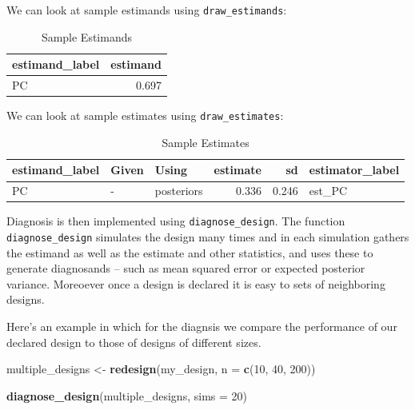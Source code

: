 \documentclass[
  12pt,
]{book}
\newenvironment{Shaded}{\begin{snugshade}}{\end{snugshade}}
\newcommand{\DataTypeTok}[1]{\textcolor[rgb]{0.13,0.29,0.53}{#1}}
\newcommand{\DecValTok}[1]{\textcolor[rgb]{0.00,0.00,0.81}{#1}}
\newcommand{\KeywordTok}[1]{\textcolor[rgb]{0.13,0.29,0.53}{\textbf{#1}}}
\newcommand{\NormalTok}[1]{#1}
\newcommand{\StringTok}[1]{\textcolor[rgb]{0.31,0.60,0.02}{#1}}
\begin{document}
We can look at sample estimands using \texttt{draw\_estimands}:

\begin{table}

\caption{\label{tab:estimands}Sample Estimands}
\centering
\begin{tabular}[t]{l|r}
\hline
estimand\_label & estimand\\
\hline
PC & 0.697\\
\hline
\end{tabular}
\end{table}

We can look at sample estimates using \texttt{draw\_estimates}:

\begin{table}

\caption{\label{tab:estimates}Sample Estimates}
\centering
\begin{tabular}[t]{l|l|l|r|r|l}
\hline
estimand\_label & Given & Using & estimate & sd & estimator\_label\\
\hline
PC & - & posteriors & 0.336 & 0.246 & est\_PC\\
\hline
\end{tabular}
\end{table}

Diagnosis is then implemented using \texttt{diagnose\_design}. The function \texttt{diagnose\_design} simulates the design many times and in each simulation gathers the estimand as well as the estimate and other statistics, and uses these to generate diagnosands -- such as mean squared error or expected posterior variance. Moreoever once a design is declared it is easy to sets of neighboring designs.

Here's an example in which for the diagnsis we compare the performance of our declared design to those of designs of different sizes.

\begin{Shaded}
\begin{Highlighting}[]
\NormalTok{multiple_designs <-}\StringTok{ }\KeywordTok{redesign}\NormalTok{(my_design, }\DataTypeTok{n =} \KeywordTok{c}\NormalTok{(}\DecValTok{10}\NormalTok{, }\DecValTok{40}\NormalTok{, }\DecValTok{200}\NormalTok{))}

\KeywordTok{diagnose_design}\NormalTok{(multiple_designs, }\DataTypeTok{sims =} \DecValTok{20}\NormalTok{)}
\end{Highlighting}
\end{Shaded}
\end{document}

